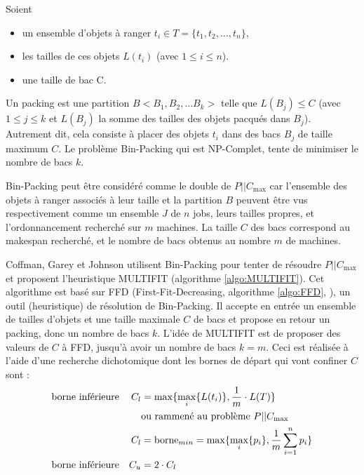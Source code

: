\documentclass[a4paper,12pt]{report}
\theoremstyle{plain}				%
\theoremstyle{definition}				%
\newcommand\problemGrahamP{$P||C_{\max}$\xspace}
\begin{document}
Soient
\begin{itemize}
  \item un ensemble d'objets à ranger $t_i \in T=\{t_1, t_2, \ldots, t_n\}$, 
  \item les tailles de ces objets $L(t_i)$ (avec $1\leq i \leq n$). 
  \item une taille de bac C.
\end{itemize} 
Un packing est une partition $B < B_1, B_2, ... B_k > $ 
  telle que $L(B_j) \leq C$ 
  (avec $1\leq j \leq k$ et $L(B_j)$ la somme des tailles des objets pacqués dans $B_j$). 
Autrement dit, cela consiste à placer des objets $t_i$ dans des bacs $B_j$ de taille maximum $C$. 
Le problème Bin-Packing qui est NP-Complet, tente de minimiser le nombre de bacs $k$. 

Bin-Packing peut être considéré comme le double de \problemGrahamP 
  car l'ensemble des objets à ranger associés à leur taille et la partition $B$ 
  peuvent être vus respectivement comme 
  un ensemble $J$ de $n$ jobs, leurs tailles propres, 
  et l'ordonnancement recherché sur $m$ machines.
La taille $C$ des bacs correspond au makespan recherché, 
  et le nombre de bacs obtenus au nombre $m$ de machines.
  
\bigskip
Coffman, Garey et Johnson \cite{coffman1978application} utilisent Bin-Packing 
  pour tenter de résoudre \problemGrahamP et proposent 
  l'heuristique MULTIFIT (algorithme \ref{algo:MULTIFIT}). 
Cet algorithme est basé sur FFD 
  (First-Fit-Decreasing, algorithme \ref{algo:FFD}, \cite{rieck2021basic}), 
  un outil (heuristique) de résolution de Bin-Packing. 
Il accepte en entrée un ensemble de tailles d'objets et une taille maximale $C$ de bacs 
  et propose en retour un packing, donc un nombre de bacs $k$.
L'idée de MULTIFIT est de proposer des valeurs de $C$ à FFD, jusqu'à avoir un nombre de bacs $k=m$.
Ceci est réalisée à l'aide d'une recherche dichotomique dont les bornes de départ qui vont confiner $C$ sont : 
\begin{align*}
&\textnormal{borne inférieure} 	&C_l 	&= \max \{ \max_i \{ L(t_i) \}, \frac{1}{m} \cdot L(T) \} \\
& 								& 		& \textnormal{ou rammené au problème \problemGrahamP} \\	 
& 								& C_l 	&= \text{borne}_{min} = \max \{ \max_i\{p_i\}, \frac{1}{m} \sum_{i=1}^{n} p_i \} \\
&\textnormal{borne inférieure} 	&C_u 	&= 2 \cdot C_l 
\end{align*}
\end{document}

